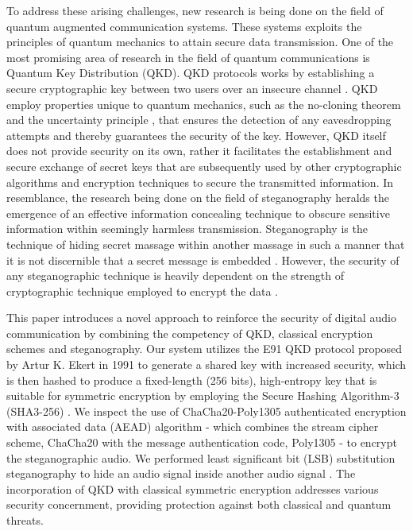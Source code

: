 \documentclass[12pt]{article}
\begin{document}
To address these arising challenges, new research is being done on the field of quantum augmented communication systems. These systems exploits the principles of quantum mechanics to attain secure data transmission. One of the most promising area of research in the field of quantum communications is Quantum Key Distribution (QKD). QKD protocols works by establishing a secure cryptographic key between two users over an insecure channel \cite{alleaume2014using}. QKD employ properties unique to quantum mechanics, such as the no-cloning theorem \cite{buvzek1996quantum} and the uncertainty principle \cite{sen2014uncertainty}, that ensures the detection of any eavesdropping attempts and thereby guarantees the security of the key. However, QKD itself does not provide security on its own, rather it facilitates the establishment and secure exchange of secret keys that are subsequently used by other cryptographic algorithms and encryption techniques to secure the transmitted information. In resemblance, the research being done on the field of steganography heralds the emergence of an effective information concealing technique to obscure sensitive information within seemingly harmless transmission. Steganography is the technique of hiding secret massage within another massage in such a manner that it is not discernible that a secret message is embedded \cite{Kahn1996}. However, the security of any steganographic technique is heavily dependent on the strength of cryptographic technique employed to encrypt the data \cite{anderson1998limits}.

This paper introduces a novel approach to reinforce the security of digital audio communication by combining the competency of QKD, classical encryption schemes and steganography. Our system utilizes the E91 QKD protocol proposed by Artur K. Ekert in 1991 \cite{Ekert1991} to generate a shared key with increased security, which is then hashed to produce a fixed-length (256 bits), high-entropy key that is suitable for symmetric encryption by employing the Secure Hashing Algorithm-3 (SHA3-256) \cite{dworkin2015sha}. We inspect the use of ChaCha20-Poly1305 authenticated encryption with associated data (AEAD) algorithm \cite{rfc7539} - which combines the stream cipher scheme, ChaCha20 \cite{bernstein2008chacha} with the message authentication code, Poly1305 \cite{bernstein2005poly1305} - to encrypt the steganographic audio. We performed least significant bit (LSB) substitution steganography to hide an audio signal inside another audio signal \cite{cvejic2002increasing}. The incorporation of QKD with classical symmetric encryption addresses various security concernment, providing protection against both classical and quantum threats.
\end{document}
